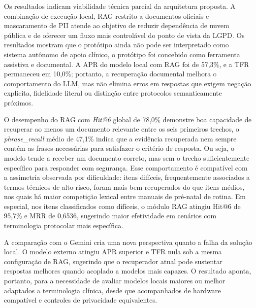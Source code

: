 Os resultados indicam viabilidade técnica parcial da arquitetura proposta.
A combinação de execução local, RAG restrito a documentos oficiais e mascaramento de PII atende ao objetivo de reduzir dependência de nuvem pública e de oferecer um fluxo mais controlável do ponto de vista da LGPD.
Os resultados mostram que o protótipo ainda não pode ser interpretado como sistema autônomo de apoio clínico, o protótipo foi concebido como ferramenta assistiva e documental.
A APR do modelo local com RAG foi de 57,3\%, e a TFR permaneceu em 10,0\%; portanto, a recuperação documental melhora o comportamento do LLM, mas não elimina erros em respostas que exigem negação explícita, fidelidade literal ou distinção entre protocolos semanticamente próximos.

O desempenho do RAG com \textit{Hit@6} global de 78,0\% demonstre boa capacidade de recuperar ao menos um documento relevante entre os seis primeiros trechos, o \textit{phrase\_recall} médio de 47,1\% indica que a evidência recuperada nem sempre contém as frases necessárias para satisfazer o critério de resposta.
Ou seja, o modelo tende a receber um documento correto, mas sem o trecho suficientemente específico para responder com segurança.
Esse comportamento é compatível com a assimetria observada por dificuldade: itens difíceis, frequentemente associados a termos técnicos de alto risco, foram mais bem recuperados do que itens médios, nos quais há maior competição lexical entre manuais de pré-natal de rotina.
Em especial, nos itens classificados como difíceis, o módulo RAG atingiu Hit@6 de 95,7\% e MRR de 0,6536, sugerindo maior efetividade em cenários com terminologia protocolar mais específica.

A comparação com o Gemini cria uma nova perspectiva quanto a falha da solução local.
O modelo externo atingiu APR superior e TFR nula sob a mesma configuração de RAG, sugerindo que o recuperador atual pode sustentar respostas melhores quando acoplado a modelos mais capazes.
O resultado aponta, portanto, para a necessidade de avaliar modelos locais maiores ou melhor adaptados a terminologia clínica, desde que acompanhados de hardware compatível e controles de privacidade equivalentes.

